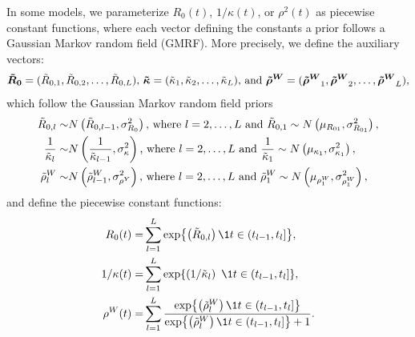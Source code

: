 In some models, we parameterize \( R_0(t) \), \( 1 / \kappa(t) \), or \( \rho^2(t) \) as piecewise constant functions, where each vector defining the constants a prior follows a Gaussian Markov random field (GMRF).
More precisely, we define the auxiliary vectors:
\begin{gather*}
\boldsymbol{\tilde{R}_0} = (\tilde{R}_{0,1}, \tilde{R}_{0,2}, \ldots, \tilde{R}_{0,L}) \text{, }
\boldsymbol{\tilde{\kappa}} = (\tilde{\kappa}_1, \tilde{\kappa}_2, \ldots, \tilde{\kappa}_L)  \text{, and }
\boldsymbol{\tilde{\rho}^W} = (\boldsymbol{\tilde{\rho}^W}_1, \boldsymbol{\tilde{\rho}^W}_2, \ldots, \boldsymbol{\tilde{\rho}^W}_L),
\end{gather*}
which follow the Gaussian Markov random field priors
\begin{equation}
\begin{aligned}
	\tilde{R}_{0,l} \sim& N\left(\tilde{R}_{0, l - 1}, \sigma_{R_0}^2\right)\text{, where } l=2,\ldots,L \text{ and } \tilde{R}_{0,1} \sim N\left(\mu_{R_{01}},\sigma^2_{R_{01}}\right),\\
	\frac{1}{\tilde{\kappa}_{l}} \sim& N\left(\frac{1}{\tilde{\kappa}_{l - 1}}, \sigma_\kappa^2\right)\text{, where } l=2,\ldots,L \text{ and } \frac{1}{\tilde{\kappa}_1} \sim N\left(\mu_{\kappa_1},\sigma^2_{\kappa_1}\right),\\
	\tilde{\rho}^W_{l} \sim& N\left(\tilde{\rho}^W_{l - 1}, \sigma_{\rho^Y}^2\right)\text{, where } l=2,\ldots,L \text{ and } \tilde{\rho}^W_1 \sim N\left(\mu_{\rho^W_1}, \sigma^2_{\rho^W_1}\right),
 \label{ch_5:eqn:GMRF}
\end{aligned}
\end{equation}
and define the piecewise constant functions:
\begin{align}
	R_0(t) =& \sum_{l=1}^L \exp{\left( \tilde{R}_{0,l} \right) \1{t \in (t_{l-1}, t_l]}},\\
	1 / \kappa(t) =& \sum_{l=1}^L \exp{\left( 1 / \kappatilde_l \right)\ \1{t \in (t_{l-1}, t_l]} },\\
	\rho^W(t) =& \sum_{l=1}^L \frac{\exp{\left( \rhowtilde_l \right) \1{t \in (t_{l-1}, t_l]} }}{\exp{\left( \rhowtilde_l \right) \1{t \in (t_{l-1}, t_l]} } + 1}.
\end{align}

